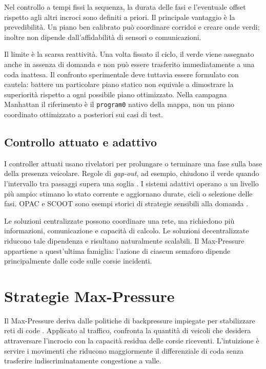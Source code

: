 \documentclass[12pt,a4paper,oneside]{report}
\numberwithin{equation}{chapter}
\begin{document}
Nel controllo a tempi fissi la sequenza, la durata delle fasi e l'eventuale
offset rispetto agli altri incroci sono definiti a priori. Il principale
vantaggio è la prevedibilità. Un piano ben calibrato può coordinare corridoi e
creare onde verdi; inoltre non dipende dall'affidabilità di sensori o
comunicazioni.

Il limite è la scarsa reattività. Una volta fissato il ciclo, il verde viene
assegnato anche in assenza di domanda e non può essere trasferito
immediatamente a una coda inattesa. Il confronto sperimentale deve tuttavia
essere formulato con cautela: battere un particolare piano statico non equivale
a dimostrare la superiorità rispetto a ogni possibile piano ottimizzato. Nella
campagna Manhattan il riferimento è il \texttt{program0} nativo della mappa, non
un piano coordinato ottimizzato a posteriori sui casi di test.

\subsection{Controllo attuato e adattivo}

I controller attuati usano rivelatori per prolungare o terminare una fase sulla
base della presenza veicolare. Regole di \emph{gap-out}, ad esempio, chiudono il
verde quando l'intervallo tra passaggi supera una soglia
\cite{cesme2012gapout}. I sistemi adattivi operano a un livello più ampio:
stimano lo stato corrente e aggiornano durate, cicli o selezione delle fasi.
OPAC e SCOOT sono esempi storici di strategie sensibili alla domanda
\cite{gartner1983opac,robertson1991scoot}.

Le soluzioni centralizzate possono coordinare una rete, ma richiedono più
informazioni, comunicazione e capacità di calcolo. Le soluzioni decentralizzate
riducono tale dipendenza e risultano naturalmente scalabili. Il Max-Pressure
appartiene a quest'ultima famiglia: l'azione di ciascun semaforo dipende
principalmente dalle code sulle corsie incidenti.

\section{Strategie Max-Pressure}

Il Max-Pressure deriva dalle politiche di backpressure impiegate per
stabilizzare reti di code \cite{tassiulas1992stability}. Applicato al traffico,
confronta la quantità di veicoli che desidera attraversare l'incrocio con la
capacità residua delle
corsie riceventi. L'intuizione è servire i movimenti che riducono maggiormente
il differenziale di coda senza trasferire indiscriminatamente congestione a
valle.
\end{document}
